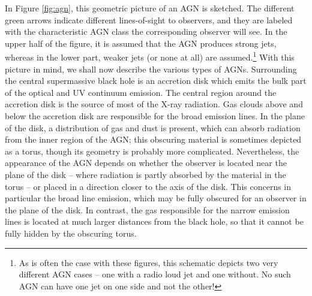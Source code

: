 \documentclass[a4paper,11pt]{article}
\begin{document}
{\noindent}In Figure \ref{fig:agn}, this geometric picture of an AGN is sketched. The different green arrows indicate different lines-of-sight to observers, and they are labeled with the characteristic AGN class the corresponding observer will see. In the upper half of the figure, it is assumed that the AGN produces strong jets, whereas in the lower part, weaker jets (or none at all) are assumed.\footnote{As is often the case with these figures, this schematic depicts two very different AGN cases -- one with a radio loud jet and one without. No such AGN can have one jet on one side and not the other!} With this picture in mind, we shall now describe the various types of AGNs. Surrounding the central supermassive black hole is an accretion disk which emits the bulk part of the optical and UV continuum emission. The central region around the accretion disk is the source of most of the X-ray radiation. Gas clouds above and below the accretion disk are responsible for the broad emission lines. In the plane of the disk, a distribution of gas and dust is present, which can absorb radiation from the inner region of the AGN; this obscuring material is sometimes depicted as a torus, though its geometry is probably more complicated. Nevertheless, the appearance of the AGN depends on whether the observer is located near the plane of the disk -- where radiation is partly absorbed by the material in the torus -- or placed in a direction closer to the axis of the disk. This concerns in particular the broad line emission, which may be fully obscured for an observer in the plane of the disk. In contrast, the gas responsible for the narrow emission lines is located at much larger distances from the black hole, so that it cannot be fully hidden by the obscuring torus. 
\end{document}
